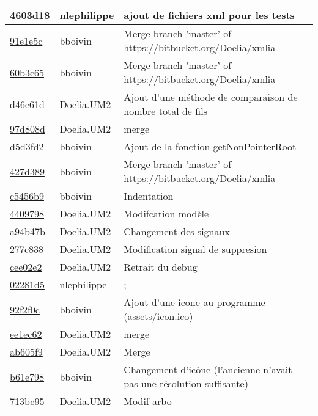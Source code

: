 \begin{tabular}{l l l}
\href{4603d1842ed4b1316e36791df3022f5ff4472c2c}{4603d18} & nlephilippe & ajout de fichiers xml pour les tests\\\hline
\href{91e1e5c99fad81af409e25612a9d072ef9c141a2}{91e1e5c} & bboivin & Merge branch 'master' of https://bitbucket.org/Doelia/xmlia\\\hline
\href{60b3c65e39b45c21cc28c7d45c19a53c90ce5ff1}{60b3c65} & bboivin & Merge branch 'master' of https://bitbucket.org/Doelia/xmlia\\\hline
\href{d46e61dec3b9379c4e61d8667015562760c84e65}{d46e61d} & Doelia.UM2 & Ajout d'une méthode de comparaison de nombre total de fils\\\hline
\href{97d808ddf4739fc709547fdec4228809431ce449}{97d808d} & Doelia.UM2 & merge\\\hline
\href{d5d3fd29b5a70ec39f77ef403ed7f8a78c0ce189}{d5d3fd2} & bboivin & Ajout de la fonction getNonPointerRoot\\\hline
\href{427d389584d8f27befbcc753db49bec22a3ef8d1}{427d389} & bboivin & Merge branch 'master' of https://bitbucket.org/Doelia/xmlia\\\hline
\href{c5456b99acb9724440dc8fc4a3b6043e9874770f}{c5456b9} & bboivin & Indentation\\\hline
\href{440979877ae8c5e67e4db1c2cbcf661cc8edc784}{4409798} & Doelia.UM2 & Modifcation modèle\\\hline
\href{a94b47b6be98dffb2bd412185020462ba986f1c3}{a94b47b} & Doelia.UM2 & Changement des signaux\\\hline
\href{277c8386acbb284243e8160e092ffa8f9db9c7d9}{277c838} & Doelia.UM2 & Modification signal de suppresion\\\hline
\href{cee02e20c277587ad88520a23236d90b5a5f6165}{cee02e2} & Doelia.UM2 & Retrait du debug\\\hline
\href{02281d5e026994e6e68c9983c85eb0aa6f8279ac}{02281d5} & nlephilippe & ;\\\hline
\href{92f2f0c6c0311a439c824f74ef17f44d166d05b7}{92f2f0c} & bboivin & Ajout d'une icone au programme (assets/icon.ico)\\\hline
\href{ee1ec6234f2b2edc2534853626ead2b12f207e94}{ee1ec62} & Doelia.UM2 & merge\\\hline
\href{ab605f9f5c9c12ded2166ad62716a1371bf6ae0b}{ab605f9} & Doelia.UM2 & Merge\\\hline
\href{b61e7982c22a8afa9b926da89f1aa5d67067dd96}{b61e798} & bboivin & Changement d'icône (l'ancienne n'avait pas une résolution suffisante)\\\hline
\href{713bc956f2fd2c8796075cf336e88e61c91fdcfa}{713bc95} & Doelia.UM2 & Modif arbo\\\hline

\end{tabular}
